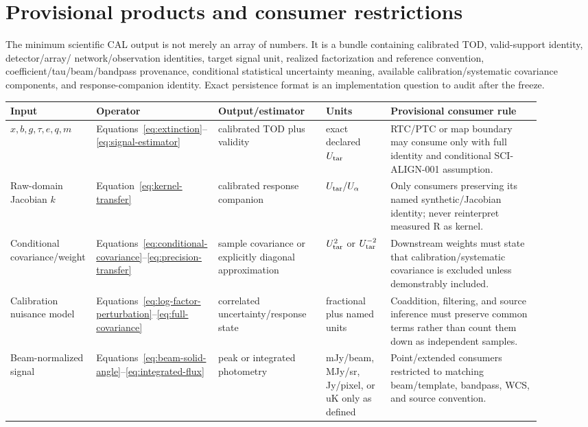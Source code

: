 \documentclass[11pt]{article}
\begin{document}
\section{Provisional products and consumer restrictions}

The minimum scientific CAL output is not merely an array of numbers.  It is a
bundle containing calibrated TOD, valid-support identity, detector/array/
network/observation identities, target signal unit, realized factorization and
reference convention, coefficient/tau/beam/bandpass provenance, conditional
statistical uncertainty meaning, available calibration/systematic covariance
components, and response-companion identity.  Exact persistence format is an
implementation question to audit after the freeze.

\begin{longtable}{L{0.14\linewidth}L{0.15\linewidth}L{0.20\linewidth}L{0.12\linewidth}L{0.29\linewidth}}
\toprule
Input & Operator & Output/estimator & Units & Provisional consumer rule\\
\midrule
\(x,b,g,\tau,\)\newline\(e,q,m\) & Equations~\eqref{eq:extinction}--\eqref{eq:signal-estimator} & calibrated TOD plus validity & exact declared \(U_{\rm tar}\) & RTC/PTC or map boundary may consume only with full identity and conditional SCI-ALIGN-001 assumption.\\
Raw-domain Jacobian \(k\) & Equation~\eqref{eq:kernel-transfer} & calibrated response companion & \(U_{\rm tar}/U_\alpha\) & Only consumers preserving its named synthetic/Jacobian identity; never reinterpret measured R as kernel.\\
Conditional covariance/weight & Equations~\eqref{eq:conditional-covariance}--\eqref{eq:precision-transfer} & sample covariance or explicitly diagonal approximation & \(U_{\rm tar}^2\) or \(U_{\rm tar}^{-2}\) & Downstream weights must state that calibration/systematic covariance is excluded unless demonstrably included.\\
Calibration nuisance model & Equations~\eqref{eq:log-factor-perturbation}--\eqref{eq:full-covariance} & correlated uncertainty/response state & fractional plus named units & Coaddition, filtering, and source inference must preserve common terms rather than count them down as independent samples.\\
Beam-normalized signal & Equations~\eqref{eq:beam-solid-angle}--\eqref{eq:integrated-flux} & peak or integrated photometry & mJy/beam, MJy/sr, Jy/pixel, or uK only as defined & Point/extended consumers restricted to matching beam/template, bandpass, WCS, and source convention.\\
\bottomrule
\end{longtable}
\end{document}
